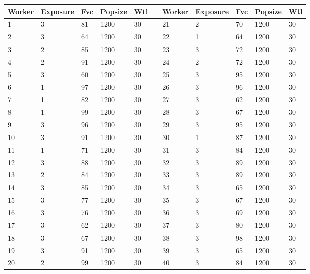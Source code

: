 \documentclass[12pt]{article}
\begin{document}
    \begin{longtable}[c]{lllllllllll}
        \hline
        Worker & Exposure & Fvc & Popsize & Wtl &  & Worker & Exposure & Fvc & Popsize & Wtl \\ \hline
        \endfirsthead
        \endhead
        \hline
        \endfoot
        \endlastfoot
        1      & 3        & 81  & 1200    & 30  &  & 21     & 2        & 70  & 1200    & 30  \\
        2      & 3        & 64  & 1200    & 30  &  & 22     & 1        & 64  & 1200    & 30  \\
        3      & 2        & 85  & 1200    & 30  &  & 23     & 3        & 72  & 1200    & 30  \\
        4      & 2        & 91  & 1200    & 30  &  & 24     & 2        & 72  & 1200    & 30  \\
        5      & 3        & 60  & 1200    & 30  &  & 25     & 3        & 95  & 1200    & 30  \\
        6      & 1        & 97  & 1200    & 30  &  & 26     & 3        & 96  & 1200    & 30  \\
        7      & 1        & 82  & 1200    & 30  &  & 27     & 3        & 62  & 1200    & 30  \\
        8      & 1        & 99  & 1200    & 30  &  & 28     & 3        & 67  & 1200    & 30  \\
        9      & 3        & 96  & 1200    & 30  &  & 29     & 3        & 95  & 1200    & 30  \\
        10     & 3        & 91  & 1200    & 30  &  & 30     & 1        & 87  & 1200    & 30  \\
        11     & 1        & 71  & 1200    & 30  &  & 31     & 3        & 84  & 1200    & 30  \\
        12     & 3        & 88  & 1200    & 30  &  & 32     & 3        & 89  & 1200    & 30  \\
        13     & 2        & 84  & 1200    & 30  &  & 33     & 3        & 89  & 1200    & 30  \\
        14     & 3        & 85  & 1200    & 30  &  & 34     & 3        & 65  & 1200    & 30  \\
        15     & 3        & 77  & 1200    & 30  &  & 35     & 3        & 67  & 1200    & 30  \\
        16     & 3        & 76  & 1200    & 30  &  & 36     & 3        & 69  & 1200    & 30  \\
        17     & 3        & 62  & 1200    & 30  &  & 37     & 3        & 80  & 1200    & 30  \\
        18     & 3        & 67  & 1200    & 30  &  & 38     & 3        & 98  & 1200    & 30  \\
        19     & 3        & 91  & 1200    & 30  &  & 39     & 3        & 65  & 1200    & 30  \\
        20     & 2        & 99  & 1200    & 30  &  & 40     & 3        & 84  & 1200    & 30  \\ \hline
    \end{longtable}
\end{document}

